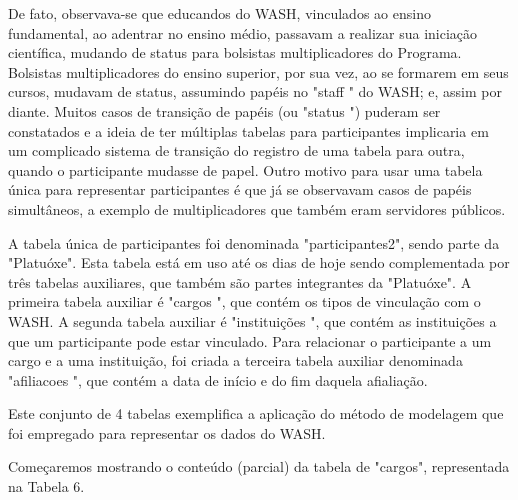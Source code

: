 De fato, observava-se que educandos do WASH, vinculados ao ensino fundamental, ao adentrar no ensino médio, passavam a realizar sua iniciação científica, mudando de status para bolsistas multiplicadores do Programa. Bolsistas multiplicadores do ensino superior, por sua vez, ao se formarem em seus cursos, mudavam de status, assumindo papéis no  "staff " do WASH; e, assim por diante. Muitos casos de transição de papéis (ou "status ") puderam ser constatados e a ideia de ter múltiplas tabelas para participantes implicaria em um complicado sistema de transição do registro de uma tabela para outra, quando o participante mudasse de papel. Outro motivo para usar uma tabela única para representar participantes é que já se observavam casos de papéis simultâneos, a exemplo de multiplicadores que também eram servidores públicos.

A tabela única de participantes foi denominada "participantes2", sendo parte da  "Platuóxe". Esta tabela está em uso até os dias de hoje sendo complementada por três tabelas auxiliares, que também são partes integrantes da "Platuóxe". A primeira tabela auxiliar é "cargos ", que contém os tipos de vinculação com o WASH. A segunda tabela auxiliar é "instituições ", que contém as instituições a que um participante pode estar vinculado. Para relacionar o participante a um cargo e a uma instituição, foi criada a terceira tabela auxiliar denominada "afiliacoes ", que contém a data de início e do fim daquela afialiação.

Este conjunto de 4 tabelas exemplifica a aplicação do método de modelagem que foi empregado para representar os dados do WASH.

Começaremos mostrando o conteúdo (parcial) da tabela de "cargos", representada na Tabela 6.





